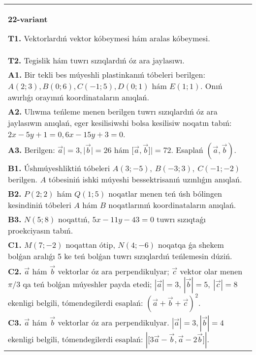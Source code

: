 \documentclass{article}
\begin{document}
\begin{tabular}{m{17cm}}
\textbf{22-variant}

\textbf{T1.} 
Vektorlardıń vektor kóbeymesi hám aralas kóbeymesi.
 \\
\textbf{T2.} 
Tegislik hám tuwrı sızıqlardıń óz ara jaylasıwı.
 \\
\textbf{A1.} 
Bir tekli bes múyeshli plastinkanıń tóbeleri berilgen:
$A (2;3), B (0;6), C (-1;5), D (0;1) $ hám $E (1;1) $. Onıń awırlıǵı
orayınıń koordinataların anıqlań.
 \\
\textbf{A2.} 
Ulıwma teńleme menen berilgen tuwrı sızıqlardıń
óz ara jaylasıwın anıqlań, eger kesilisiwshi bolsa kesilisiw noqatın
tabıń: $2x-5y+1=0, 6x-15y+3=0$.
 \\
\textbf{A3.} 
Berilgen: $\overrightarrow{a}| = 3,|\overrightarrow{b}| = 26$ hám
$\lbrack\overrightarrow{a},\overrightarrow{b}\rbrack| = 72$. Esaplań
$\left(\overrightarrow{a},\overrightarrow{b} \right) $.
 \\
\textbf{B1.} 
Úshmúyeshliktiń tóbeleri
\(A (3;-5),\ B (-3;3),\ C (-1;-2) \) berilgen. $A$ tóbesiniń ishki
múyeshi bessektrisanıń uzınlıǵın anıqlań.
 \\
\textbf{B2.} 
\(P (2;2) \) hám \(Q (1;5) \) noqatlar menen teń úsh
bólingen kesindiniń tóbeleri $A$ hám $B$ noqatlarınıń
koordinataların anıqlań.
 \\
\textbf{B3.} 
\(N (5;8) \) noqattıń, \(5x-11y-43=0\) tuwrı sızıqtaǵı
proekciyasın tabıń.
 \\
\textbf{C1.} 
\(M (7;-2) \) noqattan ótip, \(N (4;-6) \) noqatqa
ǵa shekem bolǵan aralıǵı 5 ke teń bolǵan tuwrı sızıqlardıń teńlemesin dúziń.
 \\
\textbf{C2.} 
$\vec{a}$ hám $\vec{b}$ vektorlar óz ara perpendikulyar; $\vec{c}$ vektor olar menen $\pi/3$ qa teń bolǵan múyeshler payda etedi; $|\vec{a}| = 3$, $|\vec{b}| = 5,\ |\vec{c}| = 8$ ekenligi belgili, tómendegilerdi esaplań:
$ (\vec{a} + \vec{b} + \vec{c}) ^{2}$.
 \\
\textbf{C3.} 
$\vec{a}$ hám $\vec{b}$ vektorlar óz ara perpendikulyar. $|\vec{a}| = 3,|\vec{b}| = 4$ ekenligi belgili, tómendegilerdi esaplań:
$|\lbrack 3\vec{a} - \vec{b},\vec{a}-2\vec{b}\rbrack|$.
 \\

\end{tabular}
\vspace{1cm}
\end{document}
